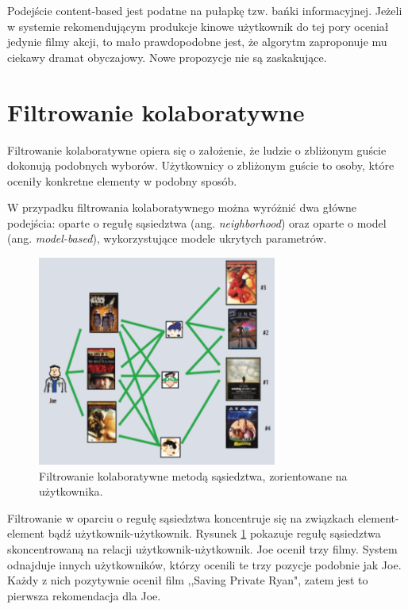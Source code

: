 \documentclass[twoside]{iisthesis}
\begin{document}
	 Podejście content-based jest podatne na pułapkę tzw. bańki informacyjnej. Jeżeli w systemie rekomendującym produkcje kinowe użytkownik do tej pory oceniał jedynie filmy akcji, to mało prawdopodobne jest, że algorytm zaproponuje mu ciekawy dramat obyczajowy. Nowe propozycje nie są zaskakujące\cite{id:ContentBasedRecommenderSystemsState}.
	 
	 \section{Filtrowanie kolaboratywne}
	 
	 Filtrowanie kolaboratywne opiera się o założenie, że ludzie o zbliżonym guście dokonują podobnych wyborów. Użytkownicy o zbliżonym guście to osoby, które oceniły konkretne elementy w podobny sposób\cite{id:IntroductionToRecommenderSystemsHandbook}\cite{id:CollaborativeFilteringRecommenderSystems}\cite{id:huynh2012modeling}. 
	 
	 W przypadku filtrowania kolaboratywnego można wyróżnić dwa główne podejścia: oparte o regułę sąsiedztwa (ang. \textit{neighborhood}) oraz oparte o model (ang. \textit{model-based}), wykorzystujące modele ukrytych parametrów\cite{koren2009matrix}\cite{id:AdvancesInCollaborativeFiltering}. 
	 
	 \begin{figure}[!ht] 
	 	\centering
	 	\includegraphics[width=0.7\textwidth]{cf}
	 	\caption{Filtrowanie kolaboratywne metodą sąsiedztwa,  zorientowane na użytkownika\protect\cite{koren2009matrix}.}
	 	\label{fig:cf}
	 \end{figure}
	 
	 Filtrowanie w oparciu o regułę sąsiedztwa koncentruje się na związkach element-element bądź użytkownik-użytkownik\cite{id:AdvancesInCollaborativeFiltering}.
	 Rysunek \ref{fig:cf} pokazuje regułę sąsiedztwa skoncentrowaną na relacji użytkownik-użytkownik. Joe ocenił trzy filmy. System odnajduje innych użytkowników, którzy ocenili te trzy pozycje podobnie jak Joe. Każdy z nich pozytywnie ocenił film ,,Saving Private Ryan", zatem jest to pierwsza rekomendacja dla Joe. 
	 
\end{document}
